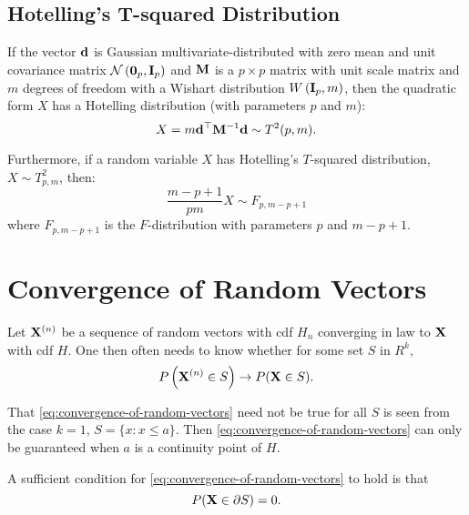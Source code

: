 \subsection{Hotelling's T-squared Distribution}

\begin{definition}
	If the vector ${\bf d}$ is Gaussian multivariate-distributed with zero mean and unit covariance matrix ${\mathcal N}\left(\mathbf{0}_p,{\bf I}_{p}\right)$ and ${\bf M}$ is a $p\times p$ matrix with unit scale matrix and $m$ degrees of freedom with a Wishart distribution $W\left({\bf I}_{p},m\right)$, then the quadratic form $X$ has a Hotelling distribution (with parameters $p$ and $m$):
	\begin{equation*}
		X=m{\bf d}^{\top}{\bf M}^{-1}{\bf d}\sim T^2(p,m) .
	\end{equation*}

	Furthermore, if a random variable $X$ has Hotelling's $T$-squared distribution, $X \sim T_{p,m}^2$, then:
	\begin{equation*}
		\frac{m-p+1}{pm}X\sim F_{p,m-p+1}
	\end{equation*}
	where $F_{p,m-p+1}$ is the $F$-distribution with parameters $p$ and $m-p+1$.
\end{definition}

\section{Convergence of Random Vectors}

Let ${\bf X}^{(n)}$ be a sequence of random vectors with cdf $H_n$ converging in law to ${\bf X}$ with cdf $H$. One then often needs to know whether for some set $S$ in $R^k$,
\begin{equation}
	\label{eq:convergence-of-random-vectors}
	P\left({\bf X}^{(n)} \in S\right) \rightarrow P({\bf X} \in S) .
\end{equation}

That \eqref{eq:convergence-of-random-vectors} need not be true for all $S$ is seen from the case $k=1$, $S=\{x:x\leq a\}$. Then \eqref{eq:convergence-of-random-vectors} can only be guaranteed when $a$ is a continuity point of $H$.
\begin{theorem}
	\label{thm:sufficient-condition-for-convergence-of-random-vectors}
	A sufficient condition for \eqref{eq:convergence-of-random-vectors} to hold is that
	\begin{equation*}
		P({\bf X}\in\partial S)=0 .
	\end{equation*}
\end{theorem}

